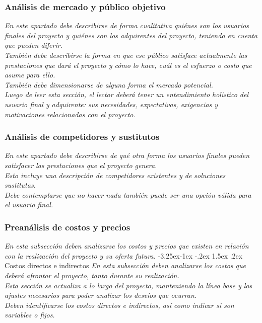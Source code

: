 \documentclass[12pt]{article}
\makeatletter
\renewcommand\paragraph{\@startsection{paragraph}{4}{\z@}%
                                     {-3.25ex\@plus -1ex \@minus -.2ex}%
                                     {1.5ex \@plus .2ex}%
                                     {\normalfont\normalsize\bfseries}}
\makeatother
\begin{document}
\subsubsection{Análisis de mercado y público objetivo}
{\it
En este apartado debe describirse de forma cualitativa quiénes son los usuarios finales del proyecto y quiénes son los adquirentes del proyecto, teniendo en cuenta que pueden diferir.\\
También debe describirse la forma en que ese público satisface actualmente las prestaciones que dará el proyecto y cómo lo hace, cuál es el esfuerzo o costo que asume para ello.\\
También debe dimensionarse de alguna forma el mercado potencial.\\
Luego de leer esta sección, el lector deberá tener un entendimiento holístico del usuario final y adquirente: sus necesidades, expectativas, exigencias y motivaciones relacionadas con el proyecto.
}

\subsubsection{Análisis de competidores y sustitutos}
{\it
En este apartado debe describirse de qué otra forma los usuarios finales pueden satisfacer las prestaciones que el proyecto genera.\\
Esto incluye una descripción de competidores existentes y de soluciones sustitutas.\\
Debe contemplarse que no hacer nada también puede ser una opción válida para el usuario final.
}

\subsubsection{Preanálisis de costos y precios}
{\it
En esta subsección deben analizarse los costos y precios que existen en relación con la realización del proyecto y su oferta futura.
}
    \paragraph{Costos directos e indirectos}
    {\it
    En esta subsección deben analizarse los costos que deberá afrontar el proyecto, tanto durante su realización.\\
    Esta sección se actualiza a lo largo del proyecto, manteniendo la línea base y los ajustes necesarios para poder analizar los desvíos que ocurran.\\
    Deben identificarse los costos directos e indirectos, así como indicar si son variables o fijos.
    }
\end{document}
